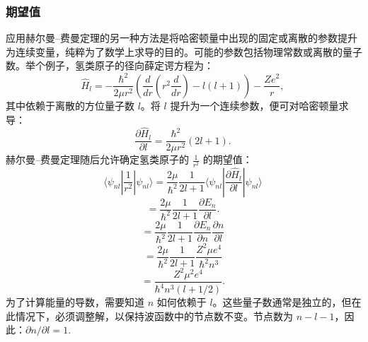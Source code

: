 \subsubsection{期望值}
应用赫尔曼–费曼定理的另一种方法是将哈密顿量中出现的固定或离散的参数提升为连续变量，纯粹为了数学上求导的目的。可能的参数包括物理常数或离散的量子数。举个例子，氢类原子的径向薛定谔方程为：
\[
\hat{H}_l = - \frac{\hbar^2}{2\mu r^2} \left( \frac{d}{dr} \left( r^2 \frac{d}{dr} \right) - l(l+1) \right) - \frac{Ze^2}{r},~
\]
其中依赖于离散的方位量子数 \(l\)。将 \(l\) 提升为一个连续参数，便可对哈密顿量求导：
\[
\frac{\partial \hat{H}_l}{\partial l} = \frac{\hbar^2}{2\mu r^2}(2l+1).~
\]
赫尔曼–费曼定理随后允许确定氢类原子的 \(\frac{1}{r^2}\) 的期望值：
\[
\langle \psi_{nl} \left| \frac{1}{r^2} \right| \psi_{nl} \rangle = \frac{2\mu}{\hbar^2} \frac{1}{2l+1} \langle \psi_{nl} \left| \frac{\partial \hat{H}_l}{\partial l} \right| \psi_{nl} \rangle ~
\]
\[=\frac{2\mu}{\hbar^2} \frac{1}{2l+1} \frac{\partial E_n}{\partial l}.~\]
\[
= \frac{2\mu}{\hbar^2} \frac{1}{2l+1} \frac{\partial E_n}{\partial n} \frac{\partial n}{\partial l}~
\]
\[
= \frac{2\mu}{\hbar^2} \frac{1}{2l+1} \frac{Z^2 \mu e^4}{\hbar^2 n^3}~
\]
\[
= \frac{Z^2 \mu^2 e^4}{\hbar^4 n^3 (l + 1/2)}.~
\]
为了计算能量的导数，需要知道 \(n\) 如何依赖于 \(l\)。这些量子数通常是独立的，但在此情况下，必须调整解，以保持波函数中的节点数不变。节点数为 \(n - l - 1\)，因此：\(\partial n/\partial l = 1.\)
